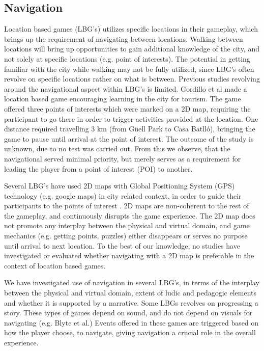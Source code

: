 \subsection{Navigation}
Location based games (LBG's) utilizes specific locations in their gameplay, which brings up the requirement of navigating between locations. Walking between locations will bring up opportunities to gain additional knowledge of the city, and not solely at specific locations (e.g. point of interests). The potential in getting familiar with the city while walking may not be fully utilized, since LBG's often revolve on specific locations rather on what is between. Previous studies revolving around the navigational aspect within LBG’s is limited. 
Gordillo et al made a location based game encouraging learning in the city for tourism\cite{Learninggamified}. The game offered three points of interests which were marked on a 2D map, requiring the participant to go there in order to trigger activities provided at the location.  One distance required travelling 3 km (from Güell Park to Casa Batlló), bringing the game to pause until arrival at the point of interest.  The outcome of the study is unknown, due to no test was carried out.  From this we observe, that the navigational served minimal priority, but merely serves as a requirement for leading the player from a point of interest (POI) to another. 

Several LBG's have used 2D maps with Global Positioning System (GPS) technology (e.g. google maps) in city related context, in order to guide their participants to the points of interest \cite{TheoreticalAndMethod, Learninggamified, knowcity, Carrigy:2010:DEP:1868914.1868929, GamingTourism, Procyk:2013:GLG:2468356.2468550, Bell:2009:ESN:1518701.1518723}. 2D maps are non-coherent to the rest of the gameplay, and continuously disrupts the game experience. The 2D map does not promote any interplay between the physical and virtual domain, and game mechanics (e.g. getting points, puzzles) either disappears or serves no purpose until arrival to next location.  To the best of our knowledge, no studies have investigated or evaluated whether navigating with a 2D map is preferable in the context of location based games. 

We have investigated use of navigation in several LBG's, in terms of the interplay between the physical and virtual domain, extent of ludic and pedagogic elements and whether it is supported by a narrative. Some LBGs revolves on progressing a story. These types of games depend on sound, and do not depend on visuals for navigating (e.g. Blyte et al.) Events offered in these games are triggered based on how the player choose, to navigate, giving navigation a crucial role in the overall experience.

